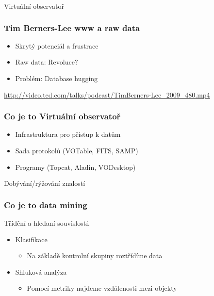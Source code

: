 \documentclass[fleqn]{beamer}
\begin{document}
\begin{section}{Virtuální observatoř}
\begin{frame}\frametitle{Tim Berners-Lee www a raw data}

\begin{itemize}
\item  Skrytý potenciál a frustrace
\item  Raw data: Revoluce?
\item  Problém: Database hugging
\end{itemize}

\url{http://video.ted.com/talks/podcast/TimBerners-Lee_2009_480.mp4}

\end{frame}

\begin{frame}\frametitle{Co je to Virtuální observatoř}

\begin{itemize}
\item Infrastruktura pro přístup k datům
\item Sada protokolů (VOTable, FITS, SAMP)
\item Programy (Topcat, Aladin, VODesktop)
\end{itemize}
\end{frame}
\end{section}

\begin{section}{Dobývání/rýžování znalostí}

\begin{frame}\frametitle{Co je to data mining}

    Třídění a hledaní souvislostí.

    \begin{itemize}
    \item  Klasifikace

      \begin{itemize}
        \item  Na základě kontrolní skupiny roztřídíme data
      \end{itemize}

    \item  Shluková analýza      
      
      \begin{itemize}
      \item  Pomocí metriky najdeme vzdálenosti mezi objekty        
      \end{itemize}

    \end{itemize}
\end{frame}
\end{section}
\end{document}

